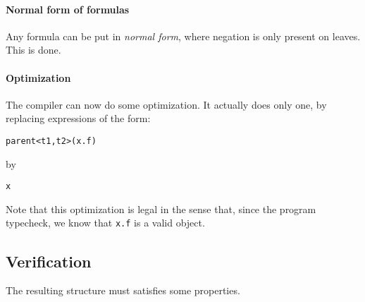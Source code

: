 \documentclass[10pt,a4paper]{article}
\newcommand{\ocaml}{\texttt}
\begin{document}
\paragraph{Normal form of formulas}
Any formula can be put in \emph{normal form}, where negation is only present on leaves. This is done.

\paragraph{Optimization}
The compiler can now do some optimization. It actually does only one, by replacing expressions of the form:
\begin{verbatim}
parent<t1,t2>(x.f)
\end{verbatim}
by
\begin{verbatim}
x
\end{verbatim}
Note that this optimization is legal in the sense that, since the program typecheck, we know that \ocaml{x.f} is a valid object.

\subsection{Verification}
The resulting structure must satisfies some properties.
\end{document}
